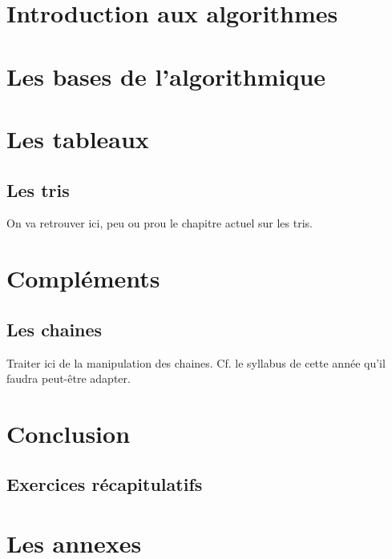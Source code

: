 \documentclass[a4paper,doubleside]{book}
\begin{document}

	
	
	

	\part{Introduction aux algorithmes}	
		
		
		

	\part{Les bases de l'algorithmique}
		
		
		
		
		

	\part{Les tableaux}
		
		\chapter{Les tris}
			\begin{Note}
			On va retrouver ici,
			peu ou prou le chapitre actuel sur les tris.
			\end{Note}
	
	\part{Compléments}
		\chapter{Les chaines}
			\begin{Note}
			Traiter ici de la manipulation des chaines.
			Cf. le syllabus de cette année
			qu'il faudra peut-être adapter.
			\end{Note}

		

	\part{Conclusion}
		\chapter{Exercices récapitulatifs}

	
	\appendix
	
	\part{Les annexes}
		
		
	
	
\end{document}
